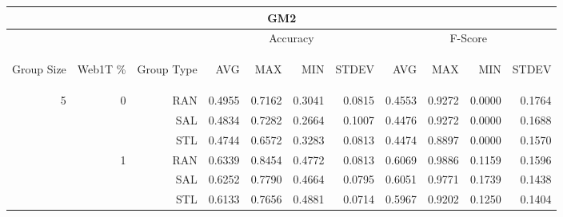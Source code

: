 \begin{center}
\begin{table}[htbp] 
 \begin{center}
\begin{tabular}{ | r | r | r | r | r | r | r | r | r | r | r |}
\hline
\multicolumn{11}{|c|}{GM2}\\
\hline
 & & & \multicolumn{4}{|c|}{Accuracy} & \multicolumn{4}{|c|}{F-Score}\\ \cline{4-11}
\begin{sideways}Group Size\end{sideways} & \begin{sideways}Web1T \%\end{sideways} & \begin{sideways}Group Type\end{sideways} & \begin{sideways}AVG\end{sideways} & \begin{sideways}MAX\end{sideways} & \begin{sideways}MIN\end{sideways} & \begin{sideways}STDEV\end{sideways} & \begin{sideways}AVG\end{sideways} & \begin{sideways}MAX\end{sideways} & \begin{sideways}MIN\end{sideways} & \begin{sideways}STDEV\end{sideways}\\
\hline
\multirow{18}{*}{5}
 & \multirow{3}{*}{0} & RAN & 0.4955 & 0.7162 & 0.3041 & 0.0815 & 0.4553 & 0.9272 & 0.0000 & 0.1764\\ \cline{3-11}
 &   & SAL & 0.4834 & 0.7282 & 0.2664 & 0.1007 & 0.4476 & 0.9272 & 0.0000 & 0.1688\\ \cline{3-11}
 &   & STL & 0.4744 & 0.6572 & 0.3283 & 0.0813 & 0.4474 & 0.8897 & 0.0000 & 0.1570\\ \cline{2-11}
 & \multirow{3}{*}{1} & RAN & 0.6339 & 0.8454 & 0.4772 & 0.0813 & 0.6069 & 0.9886 & 0.1159 & 0.1596\\ \cline{3-11}
 &   & SAL & 0.6252 & 0.7790 & 0.4664 & 0.0795 & 0.6051 & 0.9771 & 0.1739 & 0.1438\\ \cline{3-11}
 &   & STL & 0.6133 & 0.7656 & 0.4881 & 0.0714 & 0.5967 & 0.9202 & 0.1250 & 0.1404\\ \cline{2-11}

\end{tabular}
\end{center}
\end{table}
\end{center}
